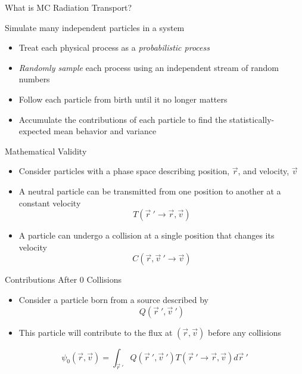 \documentclass[xcolor=x11names,compress]{beamer}
\renewcommand{\(}{\begin{columns}}
\renewcommand{\)}{\end{columns}}
\newcommand{\<}[1]{\begin{column}{#1}}
\renewcommand{\>}{\end{column}}
\begin{document}
\begin{frame}{What is MC Radiation Transport?}

Simulate many independent particles in a system
\begin{itemize}
\item Treat each physical process as a
\textit{probabilistic process}
\pause
\item \textit{Randomly sample} each process using an
independent stream of random numbers
\pause
\item Follow each particle from birth until it no
longer matters
\pause
\item Accumulate the contributions of each
particle to find the statistically-expected
mean behavior and variance
\end{itemize}

\end{frame}


\begin{frame}{Mathematical Validity}

\begin{itemize}
\item Consider particles with a phase space
describing position, $\vec{r}$, and velocity, $\vec{v}$
\vspace*{0.5 em}
\item A neutral particle can be transmitted
from one position to another at a
constant velocity
\[T(\vec{r}\:' \rightarrow \vec{r}, \vec{v})\]
\pause
\item A particle can undergo a collision at a
single position that changes its velocity
\[C(\vec{r}, \vec{v}\:' \rightarrow \vec{v})\]
\end{itemize}

\end{frame}


\begin{frame}{Contributions After 0 Collisions}

\begin{itemize}
\item Consider a particle born from a source
described by 
\[Q(\vec{r}\:', \vec{v}\:')\]
\item This particle will contribute to the flux at $(\vec{r}, \vec{v})$ before any collisions
\end{itemize}

\[\psi_0(\vec{r}, \vec{v}) = \int_{\vec{r}\:'} Q(\vec{r}\:', \vec{v}\:')T(\vec{r}\:' \rightarrow \vec{r}, \vec{v}) d\vec{r}\:'\]

\end{frame}
\end{document}
